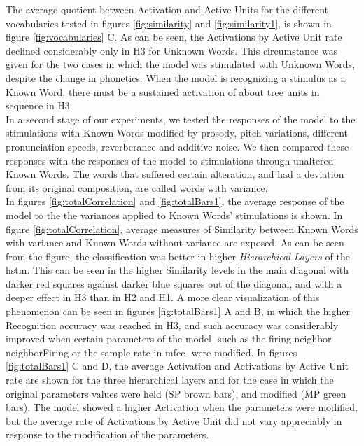 \documentclass[11pt,a4paper]{article}
\begin{document}
The average quotient between Activation and Active Units for the different vocabularies
tested in figures \ref{fig:similarity} and \ref{fig:similarity1}, is shown in figure
\ref{fig:vocabularies} C.
As can be seen, the Activations by Active Unit rate declined considerably only in H3 for Unknown Words.
This circumstance was given for the two cases in which the model was stimulated with Unknown Words,
despite the change in phonetics.
When the model is recognizing a stimulus as a Known Word, there must be a sustained activation
of about tree units in sequence in H3.\\

In a second stage of our experiments, we tested the responses of the model to
the stimulations with Known Words modified by prosody,
pitch variations, different pronunciation speeds, reverberance and additive noise.
We then compared these responses with the responses of the model to stimulations through
unaltered Known Words.
The words that suffered certain alteration,
and had a deviation from its original composition,
are called words with variance.\\

In figures \ref{fig:totalCorrelation} and \ref{fig:totalBars1},
the average response of the model to the the variances applied to
Known Words' stimulations is shown.
In figure \ref{fig:totalCorrelation}, average measures of Similarity between Known Words with variance
and Known Words without variance are exposed.
As can be seen from the figure, the classification was better in higher \textit{Hierarchical Layers} of the \ac{hstm}.
This can be seen in the higher Similarity levels in the main diagonal with darker red squares
against darker blue squares out of the diagonal, and with a deeper effect in H3 than in H2 and H1.
A more clear visualization of this phenomenon can be seen in figures \ref{fig:totalBars1} A and B, in which
the higher Recognition accuracy was reached in H3, and such accuracy was considerably improved when
certain parameters of the model -such as the firing neighbor \ac{neighborFiring} or the sample rate in \ac{mfcc}-
were modified.
In figures \ref{fig:totalBars1} C and D, the average Activation and Activations
by Active Unit rate are shown for the three hierarchical
layers and for the case in which the original parameters values were held (SP brown bars), and modified
(MP green bars).
The model showed a higher Activation when the parameters were modified, but the average rate of
Activations by Active Unit did not vary appreciably in response to the modification of the parameters.\\
\end{document}
